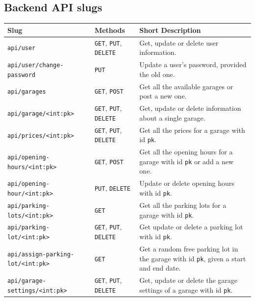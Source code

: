 \begin{appendices}
\section{Backend API slugs}\label{app:backend-api-slugs}
\begin{table}[htp]
    \centering
    \begin{tabular}{|l|l|p{7cm}|}
        \hline
         \textbf{Slug} & \textbf{Methods} & \textbf{Short Description}  \\
         \hline
         \hline
         \texttt{api/user} &  \texttt{GET}, \texttt{PUT}, \texttt{DELETE} & Get, update or delete user information.\\
        \hline
        \texttt{api/user/change-password} &  \texttt{PUT} & Update a user's password, provided the old one.\\
        \hline
        \texttt{api/garages} &  \texttt{GET}, \texttt{POST}& Get all the available garages or post a new one.\\
        \hline
        \texttt{api/garage/<int:pk>} &  \texttt{GET}, \texttt{PUT}, \texttt{DELETE
        } & Get, update or delete information about a single garage.\\
        \hline
        \texttt{api/prices/<int:pk>} &  \texttt{GET}, \texttt{PUT}, \texttt{DELETE
        } & Get all the prices for a garage with id \texttt{pk}.\\
        \hline
        \texttt{api/opening-hours/<int:pk>} &  \texttt{GET}, \texttt{POST} & Get all the opening hours for a garage with id \texttt{pk} or add a new one.\\
        \hline
        \texttt{api/opening-hour/<int:pk>} &  \texttt{PUT}, \texttt{DELETE} & Update or delete opening hours with id \texttt{pk}.\\
        \hline
        \texttt{api/parking-lots/<int:pk>} &  \texttt{GET} & Get all the parking lots for a garage with id \texttt{pk}.\\
        \hline
        \texttt{api/parking-lot/<int:pk>} &  \texttt{GET}, \texttt{PUT}, \texttt{DELETE
        } & Get update or delete a parking lot with id \texttt{pk}. \\
        \hline
        \texttt{api/assign-parking-lot/<int:pk>} &  \texttt{GET} & Get a random free parking lot in the garage with id \texttt{pk}, given a start and end date. \\
        \hline
        \texttt{api/garage-settings/<int:pk>} &  \texttt{GET}, \texttt{PUT}, \texttt{DELETE
        } & Get, update or delete the garage settings of a garage with id \texttt{pk}.\\

\end{tabular}
\end{table}
\end{appendices}
